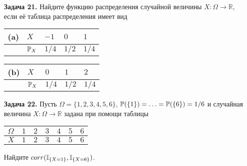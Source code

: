 \textbf{Задача 21.} Найдите функцию распределения случайной величины $X:\Omega \to {\mathbb R}$, если её таблица распределения имеет вид

\begin{tabular}{|p{0.4in}|p{0.5in}|p{0.5in}|p{0.5in}|p{0.5in}|} \hline 
       (a) & $X$ & $-1$ & $0$ & $1$ \\ \hline 
\underbar{} & ${\rm {\mathbb P}}_{X} $ & $1/4$ & $1/2$ & $1/4$ \\ \hline 
\end{tabular}



\begin{tabular}{|p{0.4in}|p{0.5in}|p{0.5in}|p{0.5in}|p{0.5in}|} \hline 
       (b) & $X$ & $0$ & $1$ & $2$ \\ \hline 
\underbar{} & ${\rm {\mathbb P}}_{X} $ & $1/4$ & $1/2$ & $1/4$ \\ \hline 
\end{tabular}

\textbf{Задача 22.} Пусть $\Omega =\{ 1,2,3,4,5,6\} $, ${\rm {\mathbb P}}(\{ 1\} )=\ldots ={\rm {\mathbb P}}(\{ 6\} )=1/6$ и случайная величина $X:\Omega \to {\mathbb R}$ задана при помощи таблицы 

\begin{tabular}{|p{0.3in}|p{0.3in}|p{0.3in}|p{0.2in}|p{0.3in}|p{0.2in}|p{0.3in}|} \hline 
$\Omega $ & $1$ & $2$ & $3$ & $4$ & $5$ & $6$ \\ \hline 
$X$ & $1$ & $2$ & $3$ & $4$ & $5$ & $6$ \\ \hline 
\end{tabular}

Найдите $corr({\rm {\mathbb I}}_{\{ X=1\} } ,{\rm {\mathbb I}}_{\{ X=6\} } )$.




